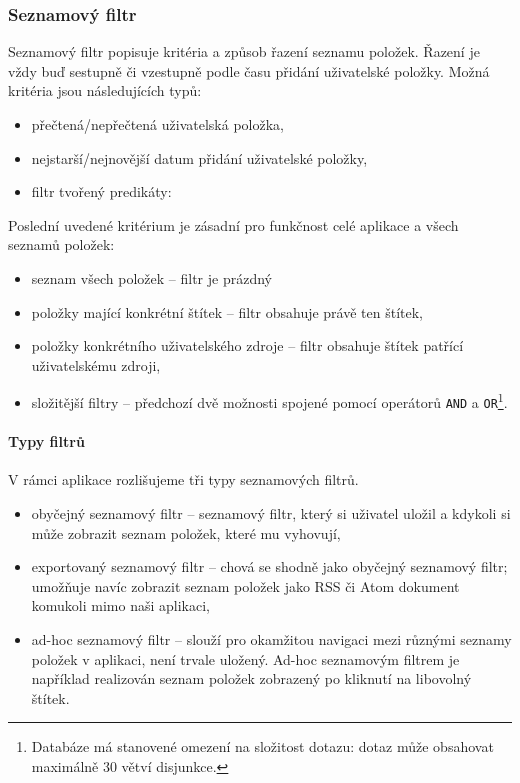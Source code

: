 \subsubsection{Seznamový filtr}

Seznamový filtr popisuje kritéria a způsob řazení seznamu položek.
Řazení je vždy buď sestupně či vzestupně podle času přidání uživatelské položky.
Možná kritéria jsou následujících typů:
\begin{itemize}
	\item přečtená/nepřečtená uživatelská položka,
	\item nejstarší/nejnovější datum přidání uživatelské položky,
	\item filtr tvořený predikáty: 
\end{itemize}

Poslední uvedené kritérium je zásadní pro funkčnost celé aplikace a všech seznamů položek:
\begin{itemize}
	\item seznam všech položek -- filtr je prázdný
	\item položky mající konkrétní štítek -- filtr obsahuje právě ten štítek,
	\item položky konkrétního uživatelského zdroje -- filtr obsahuje štítek patřící uživatelskému zdroji,
	\item složitější filtry -- předchozí dvě možnosti spojené pomocí operátorů \verb|AND| a \verb|OR|\footnote{Databáze má stanovené omezení na složitost dotazu: dotaz může obsahovat maximálně 30 větví disjunkce.}.
\end{itemize}

\paragraph{Typy filtrů}
V rámci aplikace rozlišujeme tři typy seznamových filtrů.
\begin{itemize}
	\item obyčejný seznamový filtr -- seznamový filtr, který si uživatel uložil a kdykoli si může zobrazit seznam položek, které mu vyhovují,
	\item exportovaný seznamový filtr -- chová se shodně jako obyčejný seznamový filtr; umožňuje navíc zobrazit seznam položek jako RSS či Atom dokument komukoli mimo naši aplikaci,
	\item ad-hoc seznamový filtr -- slouží pro okamžitou navigaci mezi různými seznamy položek v aplikaci, není trvale uložený.
		Ad-hoc seznamovým filtrem je například realizován seznam položek zobrazený po kliknutí na libovolný štítek.
\end{itemize}


